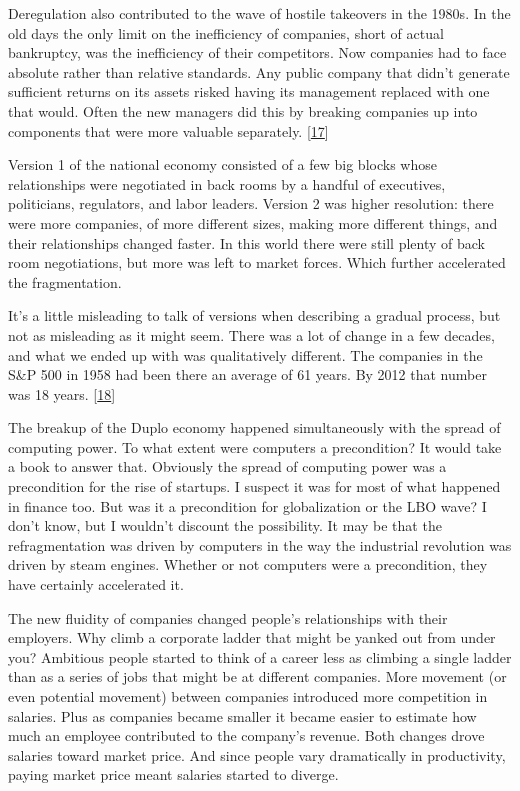 Deregulation also contributed to the wave of hostile takeovers in
the 1980s.  In the old days the only limit on the inefficiency of
companies, short of actual bankruptcy, was the inefficiency of their
competitors.  Now companies had to face absolute rather than relative
standards.  Any public company that didn't generate sufficient
returns on its assets risked having its management replaced with
one that would.  Often the new managers did this by breaking companies
up into components that were more valuable separately.
[\href{\#f17n}{17}]

Version 1 of the national economy consisted of a few big blocks
whose relationships were negotiated in back rooms by a handful of
executives, politicians, regulators, and labor leaders.  Version 2
was higher resolution: there were more companies, of more different
sizes, making more different things, and their relationships changed
faster. In this world there were still plenty of back room negotiations,
but more was left to market forces.  Which further accelerated the
fragmentation.

It's a little misleading to talk of versions when describing a
gradual process, but not as misleading as it might seem.  There was
a lot of change in a few decades, and what we ended up with was
qualitatively different.  The companies in the S\&P 500 in 1958 had
been there an average of 61 years. By 2012 that number was 18 years.
[\href{\#f18n}{18}]

The breakup of the Duplo economy happened simultaneously with the
spread of computing power. To what extent were computers a precondition?
It would take a book to answer that. Obviously the spread of computing
power was a precondition for the rise of startups.  I suspect it
was for most of what happened in finance too.  But was it a
precondition for globalization or the LBO wave?  I don't know, but
I wouldn't discount the possibility.  It may be that the refragmentation
was driven by computers in the way the industrial revolution was
driven by steam engines.  Whether or not computers were a precondition,
they have certainly accelerated it.

The new fluidity of companies changed people's relationships with
their employers. Why climb a corporate ladder that might be yanked
out from under you?  Ambitious people started to think of a career
less as climbing a single ladder than as a series of jobs that might
be at different companies. More movement (or even potential movement)
between companies introduced more competition in salaries.  Plus
as companies became smaller it became easier to estimate how much
an employee contributed to the company's revenue.  Both changes
drove salaries toward market price. And since people vary dramatically
in productivity, paying market price meant salaries started to
diverge.

